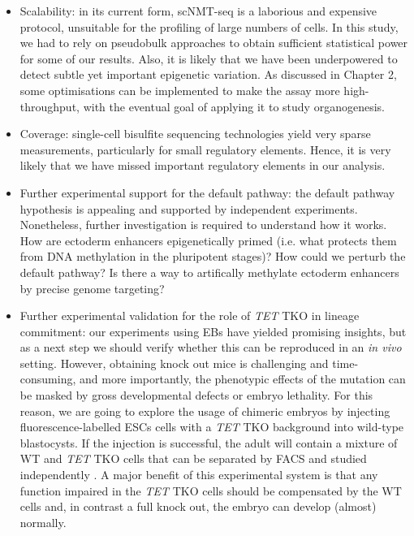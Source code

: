 \begin{itemize}
	\item Scalability: in its current form, scNMT-seq is a laborious and expensive protocol, unsuitable for the profiling of large numbers of cells. In this study, we had to rely on pseudobulk approaches to obtain sufficient statistical power for some of our results. Also, it is likely that we have been underpowered to detect subtle yet important epigenetic variation. As discussed in Chapter 2, some optimisations can be implemented to make the assay more high-throughput, with the eventual goal of applying it to study organogenesis.

	\item Coverage: single-cell bisulfite sequencing technologies yield very sparse measurements, particularly for small regulatory elements. Hence, it is very likely that we have missed important regulatory elements in our analysis.

	\item Further experimental support for the default pathway: the default pathway hypothesis is appealing and supported by independent experiments. Nonetheless, further investigation is required to understand how it works. How are ectoderm enhancers epigenetically primed (i.e. what protects them from DNA methylation in the pluripotent stages)? How could we perturb the default pathway? Is there a way to artifically methylate ectoderm enhancers by precise genome targeting?

	\item Further experimental validation for the role of \textit{TET} TKO in lineage commitment: our experiments using EBs have yielded promising insights, but as a next step we should verify whether this can be reproduced in an \textit{in vivo} setting. However, obtaining knock out mice is challenging and time-consuming, and more importantly, the phenotypic effects of the mutation can be masked by gross developmental defects or embryo lethality. For this reason, we are going to explore the usage of chimeric embryos by injecting fluorescence-labelled ESCs cells with a \textit{TET} TKO background into wild-type blastocysts. If the injection is successful, the adult will contain a mixture of WT and \textit{TET} TKO cells that can be separated by FACS and studied independently \cite{Pijuan-Sala2019}. A major benefit of this experimental system is that any function impaired in the \textit{TET} TKO cells should be compensated by the WT cells and, in contrast a full knock out, the embryo can develop (almost) normally.
	

\end{itemize}
